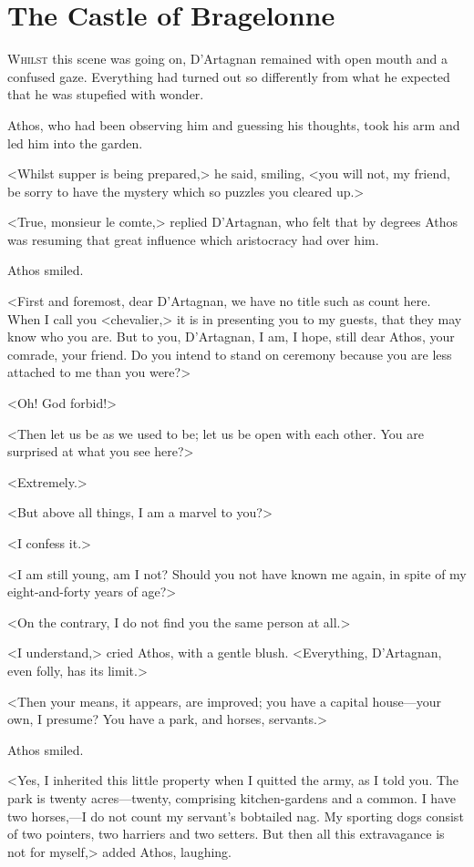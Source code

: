 \chapter{The Castle of Bragelonne}

 \lettrine{W}{hilst} this scene was going on, D'Artagnan remained with open mouth and a confused gaze. Everything had turned out so differently from what he expected that he was stupefied with wonder.

\zz
Athos, who had been observing him and guessing his thoughts, took his arm and led him into the garden.

<Whilst supper is being prepared,> he said, smiling, <you will not, my friend, be sorry to have the mystery which so puzzles you cleared up.>

<True, monsieur le comte,> replied D'Artagnan, who felt that by degrees Athos was resuming that great influence which aristocracy had over him.

Athos smiled.

<First and foremost, dear D'Artagnan, we have no title such as count here. When I call you <chevalier,> it is in presenting you to my guests, that they may know who you are. But to you, D'Artagnan, I am, I hope, still dear Athos, your comrade, your friend. Do you intend to stand on ceremony because you are less attached to me than you were?>

<Oh! God forbid!>

<Then let us be as we used to be; let us be open with each other. You are surprised at what you see here?>

<Extremely.>

<But above all things, I am a marvel to you?>

<I confess it.>

<I am still young, am I not? Should you not have known me again, in spite of my eight-and-forty years of age?>

<On the contrary, I do not find you the same person at all.>

<I understand,> cried Athos, with a gentle blush. <Everything, D'Artagnan, even folly, has its limit.>

<Then your means, it appears, are improved; you have a capital house—your own, I presume? You have a park, and horses, servants.>

Athos smiled.

<Yes, I inherited this little property when I quitted the army, as I told you. The park is twenty acres—twenty, comprising kitchen-gardens and a common. I have two horses,—I do not count my servant's bobtailed nag. My sporting dogs consist of two pointers, two harriers and two setters. But then all this extravagance is not for myself,> added Athos, laughing.

